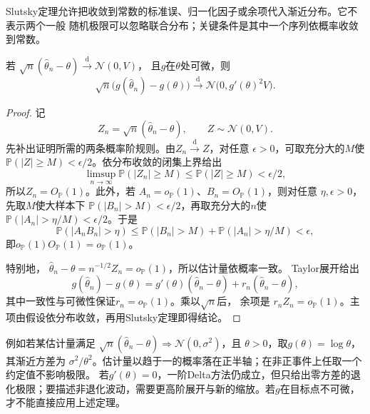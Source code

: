 Slutsky定理允许把收敛到常数的标准误、归一化因子或余项代入渐近分布。它不表示两个一般
随机极限可以忽略联合分布；关键条件是其中一个序列依概率收敛到常数。

\begin{theorem}[Delta方法]
\label{thm:statistics-delta-method}
若
\(\sqrt n(\widehat\theta_n-\theta)\xrightarrow{\mathrm d}\mathcal N(0,V)\)，
且\(g\)在\(\theta\)处可微，则
\[
  \sqrt n\bigl(g(\widehat\theta_n)-g(\theta)\bigr)
  \xrightarrow{\mathrm d}
  \mathcal N\bigl(0,g'(\theta)^2V\bigr).
\]
\end{theorem}

\begin{proof}
记
\[
  Z_n=\sqrt n(\widehat\theta_n-\theta),
  \qquad
  Z\sim\mathcal N(0,V).
\]
先补出证明所需的两条概率阶规则。由\(Z_n\xrightarrow{\mathrm d}Z\)，对任意
\(\epsilon>0\)，可取充分大的\(M\)使
\(\mathbb{P}(|Z|\geq M)<\epsilon/2\)。依分布收敛的闭集上界给出
\[
  \limsup_{n\to\infty}\mathbb{P}(|Z_n|\geq M)
  \leq \mathbb{P}(|Z|\geq M)<\epsilon/2,
\]
所以\(Z_n=O_{\mathbb{P}}(1)\)。此外，若
\(A_n=o_{\mathbb{P}}(1)\)、\(B_n=O_{\mathbb{P}}(1)\)，则对任意
\(\eta,\epsilon>0\)，先取\(M\)使大样本下
\(\mathbb{P}(|B_n|>M)<\epsilon/2\)，再取充分大的\(n\)使
\(\mathbb{P}(|A_n|>\eta/M)<\epsilon/2\)。于是
\[
  \mathbb{P}(|A_nB_n|>\eta)
  \leq
  \mathbb{P}(|B_n|>M)
  +\mathbb{P}(|A_n|>\eta/M)
  <\epsilon,
\]
即\(o_{\mathbb{P}}(1)O_{\mathbb{P}}(1)=o_{\mathbb{P}}(1)\)。

特别地，
\(\widehat\theta_n-\theta=n^{-1/2}Z_n=o_{\mathbb{P}}(1)\)，所以估计量依概率一致。
Taylor展开给出
\[
  g(\widehat\theta_n)-g(\theta)
  =g'(\theta)(\widehat\theta_n-\theta)
   +r_n(\widehat\theta_n-\theta),
\]
其中一致性与可微性保证\(r_n=o_{\mathbb{P}}(1)\)。乘以\(\sqrt n\)后，
余项是
\(r_nZ_n=o_{\mathbb{P}}(1)\)。主项由假设依分布收敛，再用Slutsky定理即得结论。
\end{proof}

例如若某估计量满足
\(\sqrt n(\widehat\theta_n-\theta)\Rightarrow\mathcal N(0,\sigma^2)\)，且
\(\theta>0\)，取\(g(\theta)=\log\theta\)，其渐近方差为
\(\sigma^2/\theta^2\)。估计量以趋于一的概率落在正半轴；在非正事件上任取一个约定值不影响极限。
若\(g'(\theta)=0\)，一阶Delta方法仍成立，但只给出零方差的退化极限；要描述非退化波动，需要更高阶展开与新的缩放。若\(g\)在目标点不可微，才不能直接应用上述定理。

